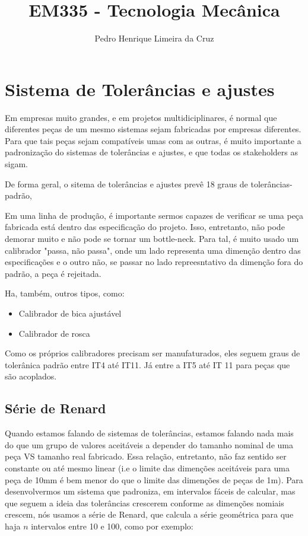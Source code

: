\documentclass{article}
\author{Pedro Henrique Limeira da Cruz}
\title{EM335 - Tecnologia Mecânica}
\begin{document}
\maketitle
\thispagestyle{empty}


\newpage
\tableofcontents
\newpage

\section{Sistema de Tolerâncias e ajustes}
Em empresas muito grandes, e em projetos multidiciplinares, é normal que diferentes peças de um mesmo sistemas sejam fabricadas por empresas diferentes. Para que tais peças sejam compatíveis umas
com as outras, é muito importante a padronização do sistemas de tolerâncias e ajustes, e que todas os stakeholders as sigam. 

De forma geral, o sitema de tolerâncias e ajustes prevê 18 graus de tolerâncias-padrão, 

Em uma linha de produção, é importante sermos capazes de verificar se uma peça fabricada está dentro das especificação do projeto. Isso, entretanto, não pode demorar muito e não pode 
se tornar um bottle-neck. Para tal, é muito usado um calibrador "passa, não passa", onde um lado representa uma dimenção dentro das especificações e o outro não, se passar no lado repreesntativo da dimenção fora do padrão, a peça é rejeitada.

Ha, também, outros tipos, como:
\begin{itemize}
    \item Calibrador de bica ajustável
    \item Calibrador de rosca
\end{itemize}

Como os próprios calibradores precisam ser manufaturados, eles seguem graus de tolerânica padrão entre IT4 até IT11. Já entre a IT5 até IT 11 para peças que são acoplados.

\subsection{Série de Renard}
Quando estamos falando de sistemas de tolerâncias, estamos falando nada mais do que um grupo de valores aceitáveis a depender do tamanho nominal de uma peça VS tamanho real fabricado. 
Essa relação, entretanto, não faz sentido ser constante ou até mesmo linear (i.e o limite das dimenções aceitáveis para uma peça de 10mm é bem menor do que o limite das dimenções de peças de 1m). Para desenvolvermos um sistema que padroniza, em intervalos fáceis de calcular, mas que seguem a ideia das tolerâncias crescerem conforme as dimenções nomiais crescem, nós usamos a série de Renard, que calcula a série geométrica para que haja $n$ intervalos entre 10 e 100, como por exemplo:
\end{document}
